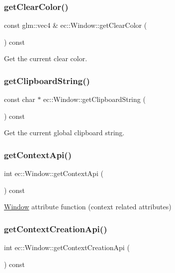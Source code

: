 \subsubsection{\texorpdfstring{get\+Clear\+Color()}{getClearColor()}}
{\footnotesize\ttfamily const glm\+::vec4 \& ec\+::\+Window\+::get\+Clear\+Color (\begin{DoxyParamCaption}{ }\end{DoxyParamCaption}) const}

Get the current clear color. \mbox{\label{classec_1_1_window_a37ac52444541b9592588c1425a1a5d3d}} 
\subsubsection{\texorpdfstring{get\+Clipboard\+String()}{getClipboardString()}}
{\footnotesize\ttfamily const char $\ast$ ec\+::\+Window\+::get\+Clipboard\+String (\begin{DoxyParamCaption}{ }\end{DoxyParamCaption}) const}

Get the current global clipboard string. \mbox{\label{classec_1_1_window_ac53f3964af1cd79cdedfebe9a14713a9}} 
\subsubsection{\texorpdfstring{get\+Context\+Api()}{getContextApi()}}
{\footnotesize\ttfamily int ec\+::\+Window\+::get\+Context\+Api (\begin{DoxyParamCaption}{ }\end{DoxyParamCaption}) const}

\mbox{\hyperlink{classec_1_1_window}{Window}} attribute function (context related attributes) \mbox{\label{classec_1_1_window_aec5ca33b1b830d16e2af60d5a7c56535}} 
\subsubsection{\texorpdfstring{get\+Context\+Creation\+Api()}{getContextCreationApi()}}
{\footnotesize\ttfamily int ec\+::\+Window\+::get\+Context\+Creation\+Api (\begin{DoxyParamCaption}{ }\end{DoxyParamCaption}) const}

